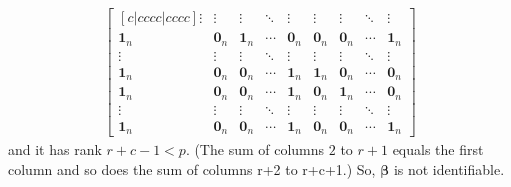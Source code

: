 \begin{align*}
\begin{bmatrix}[c|cccc|cccc]
\vdots & \vdots & \vdots & \ddots & \vdots & \vdots & \vdots & \ddots & \vdots\\
\bm{1}_{n} & \bm{0}_{n} & \bm{1}_{n} & \cdots & \bm{0}_{n} & \bm{0}_{n} & \bm{0}_{n} & \cdots & \bm{1}_{n}\\
\hline
\vdots & \vdots & \vdots & \ddots & \vdots & \vdots & \vdots & \ddots & \vdots\\
\hline
\bm{1}_{n} & \bm{0}_{n} & \bm{0}_{n} & \cdots & \bm{1}_{n} & \bm{1}_{n} & \bm{0}_{n} & \cdots & \bm{0}_{n}\\
\bm{1}_{n} & \bm{0}_{n} & \bm{0}_{n} & \cdots & \bm{1}_{n} & \bm{0}_{n} & \bm{1}_{n} & \cdots & \bm{0}_{n}\\
\vdots & \vdots & \vdots & \ddots & \vdots & \vdots & \vdots & \ddots & \vdots\\
\bm{1}_{n} & \bm{0}_{n} & \bm{0}_{n} & \cdots & \bm{1}_{n} & \bm{0}_{n} & \bm{0}_{n} & \cdots & \bm{1}_{n}
\end{bmatrix}
\end{align*}
and it has rank $r+c-1 < p$. (The sum of columns $2$ to $r+1$ equals the first column and so does the sum of columns r+2 to r+c+1.) So, $\bm{\beta}$ is not identifiable.